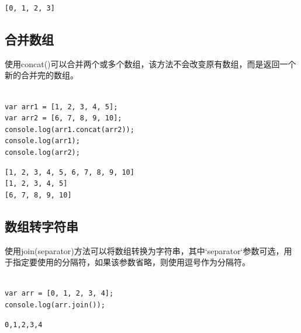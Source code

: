 \begin{tcolorbox}
	\begin{verbatim}
[0, 1, 2, 3]
	\end{verbatim}
\end{tcolorbox}

\vspace{0.5cm}

\subsection{合并数组}

使用concat()可以合并两个或多个数组，该方法不会改变原有数组，而是返回一个新的合并完的数组。\\

\\

\begin{lstlisting}[style=htmlcssjs]
var arr1 = [1, 2, 3, 4, 5];
var arr2 = [6, 7, 8, 9, 10];
console.log(arr1.concat(arr2));
console.log(arr1);
console.log(arr2);
\end{lstlisting}

\begin{tcolorbox}
	\begin{verbatim}
[1, 2, 3, 4, 5, 6, 7, 8, 9, 10]
[1, 2, 3, 4, 5]
[6, 7, 8, 9, 10]
	\end{verbatim}
\end{tcolorbox}

\vspace{0.5cm}

\subsection{数组转字符串}

使用join(separator)方法可以将数组转换为字符串，其中`separator`参数可选，用于指定要使用的分隔符，如果该参数省略，则使用逗号作为分隔符。\\

\\

\begin{lstlisting}[style=htmlcssjs]
var arr = [0, 1, 2, 3, 4];
console.log(arr.join());
\end{lstlisting}

\begin{tcolorbox}
	\begin{verbatim}
0,1,2,3,4
	\end{verbatim}
\end{tcolorbox}


